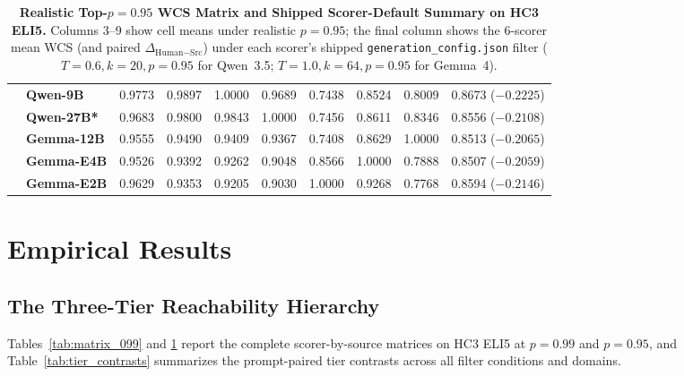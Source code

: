 \documentclass[11pt,a4paper,twocolumn]{article}
\begin{document}
\begin{table}[t]
\begin{tabular}{llcccccccc}
 & \textbf{Qwen-9B} & 0.9773 & 0.9897 & 1.0000 & 0.9689 & 0.7438 & 0.8524 & 0.8009 & 0.8673 ($-0.2225$) \\
 & \textbf{Qwen-27B*} & 0.9683 & 0.9800 & 0.9843 & 1.0000 & 0.7456 & 0.8611 & 0.8346 & 0.8556 ($-0.2108$) \\
 & \textbf{Gemma-12B} & 0.9555 & 0.9490 & 0.9409 & 0.9367 & 0.7408 & 0.8629 & 1.0000 & 0.8513 ($-0.2065$) \\
 & \textbf{Gemma-E4B} & 0.9526 & 0.9392 & 0.9262 & 0.9048 & 0.8566 & 1.0000 & 0.7888 & 0.8507 ($-0.2059$) \\
 & \textbf{Gemma-E2B} & 0.9629 & 0.9353 & 0.9205 & 0.9030 & 1.0000 & 0.9268 & 0.7768 & 0.8594 ($-0.2146$) \\
\bottomrule
\end{tabular}
\caption{\textbf{Realistic Top-$p=0.95$ WCS Matrix and Shipped Scorer-Default Summary on HC3 ELI5.} Columns 3--9 show cell means under realistic $p=0.95$; the final column shows the 6-scorer mean WCS (and paired $\Delta_{\text{Human}-\text{Src}}$) under each scorer's shipped \texttt{generation\_config.json} filter ($T=0.6, k=20, p=0.95$ for Qwen~3.5; $T=1.0, k=64, p=0.95$ for Gemma~4).}
\label{tab:matrix_095}
\end{table}

\section{Empirical Results}

\subsection{The Three-Tier Reachability Hierarchy}
Tables~\ref{tab:matrix_099} and \ref{tab:matrix_095} report the complete scorer-by-source matrices on HC3 ELI5 at $p=0.99$ and $p=0.95$, and Table~\ref{tab:tier_contrasts} summarizes the prompt-paired tier contrasts across all filter conditions and domains.
\end{document}
